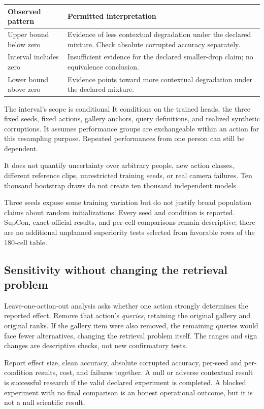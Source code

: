 \begin{tabularx}{\linewidth}{@{}Y Y@{}}
\toprule Observed pattern & Permitted interpretation\\\midrule
Upper bound below zero & Evidence of less contextual degradation under the
declared mixture. Check absolute corrupted accuracy separately.\\\addlinespace
Interval includes zero & Insufficient evidence for the declared smaller-drop
claim; no equivalence conclusion.\\\addlinespace
Lower bound above zero & Evidence points toward more contextual degradation
under the declared mixture.\\\bottomrule
\end{tabularx}

\begin{caution}{The interval's scope is conditional}
It conditions on the trained heads, the three fixed seeds, fixed actions,
gallery anchors, query definitions, and realized synthetic corruptions. It
assumes performance groups are exchangeable within an action for this resampling
purpose. Repeated performances from one person can still be dependent.

It does not quantify uncertainty over arbitrary people, new action classes,
different reference clips, unrestricted training seeds, or real camera failures.
Ten thousand bootstrap draws do not create ten thousand independent models.
\end{caution}

Three seeds expose some training variation but do not justify broad population
claims about random initializations. Every seed and condition is reported.
SupCon, exact-official results, and per-cell comparisons remain descriptive;
there are no additional unplanned superiority tests selected from favorable
rows of the 180-cell table.

\subsection{Sensitivity without changing the retrieval problem}
Leave-one-action-out analysis asks whether one action strongly determines the
reported effect. Remove that action's \emph{queries}, retaining the original
gallery and original ranks. If the gallery item were also removed, the remaining
queries would face fewer alternatives, changing the retrieval problem itself.
The ranges and sign changes are descriptive checks, not new confirmatory tests.

Report effect size, clean accuracy, absolute corrupted accuracy, per-seed and
per-condition results, cost, and failures together. A null or adverse contextual
result is successful research if the valid declared experiment is completed.
A blocked experiment with no final comparison is an honest operational outcome,
but it is not a null scientific result.

